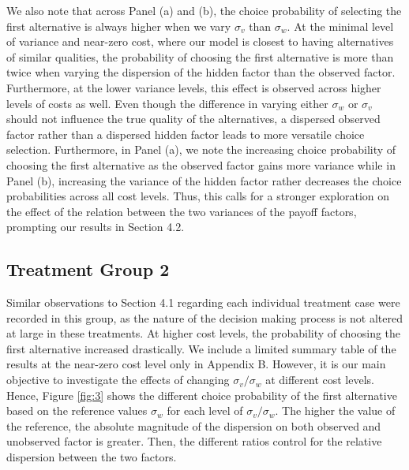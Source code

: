 \documentclass[12pt]{article}
\begin{document}
We also note that across Panel (a) and (b), the choice probability of selecting the first alternative is always higher when we vary \(\sigma_v\) than \(\sigma_w\). At the minimal level of variance and near-zero cost, where our model is closest to having alternatives of similar qualities, the probability of choosing the first alternative is more than twice when varying the dispersion of the hidden factor than the observed factor. Furthermore, at the lower variance levels, this effect is observed across higher levels of costs as well. Even though the difference in varying either \(\sigma_w\) or \(\sigma_v\) should not influence the true quality of the alternatives, a dispersed observed factor rather than a dispersed hidden factor leads to more versatile choice selection. Furthermore, in Panel (a), we note the increasing choice probability of choosing the first alternative as the observed factor gains more variance while in Panel (b), increasing the variance of the hidden factor rather decreases the choice probabilities across all cost levels. Thus, this calls for a stronger exploration on the effect of the relation between the two variances of the payoff factors, prompting our results in Section 4.2.

\subsection{Treatment Group 2}
Similar observations to Section 4.1 regarding each individual treatment case were recorded in this group, as the nature of the decision making process is not altered at large in these treatments. At higher cost levels, the probability of choosing the first alternative increased drastically. We include a limited summary table of the results at the near-zero cost level only in Appendix B. However, it is our main objective to investigate the effects of changing \(\sigma_v/\sigma_w\) at different cost levels. Hence, Figure \ref{fig:3} shows the different choice probability of the first alternative based on the reference values \(\sigma_w\) for each level of \(\sigma_v/\sigma_w\). The higher the value of the reference, the absolute magnitude of the dispersion on both observed and unobserved factor is greater. Then, the different ratios control for the relative dispersion between the two factors.
\end{document}
